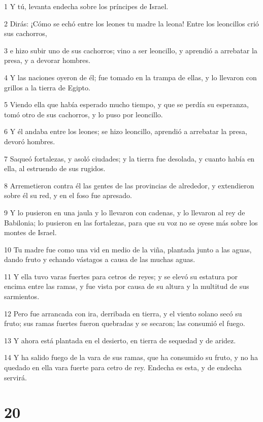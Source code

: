 \par 1 Y tú, levanta endecha sobre los príncipes de Israel.
\par 2 Dirás: ¡Cómo se echó entre los leones tu madre la leona! Entre los leoncillos crió sus cachorros,
\par 3 e hizo subir uno de sus cachorros; vino a ser leoncillo, y aprendió a arrebatar la presa, y a devorar hombres.
\par 4 Y las naciones oyeron de él; fue tomado en la trampa de ellas, y lo llevaron con grillos a la tierra de Egipto.
\par 5 Viendo ella que había esperado mucho tiempo, y que se perdía su esperanza, tomó otro de sus cachorros, y lo puso por leoncillo.
\par 6 Y él andaba entre los leones; se hizo leoncillo, aprendió a arrebatar la presa, devoró hombres.
\par 7 Saqueó fortalezas, y asoló ciudades; y la tierra fue desolada, y cuanto había en ella, al estruendo de sus rugidos.
\par 8 Arremetieron contra él las gentes de las provincias de alrededor, y extendieron sobre él su red, y en el foso fue apresado.
\par 9 Y lo pusieron en una jaula y lo llevaron con cadenas, y lo llevaron al rey de Babilonia; lo pusieron en las fortalezas, para que su voz no se oyese más sobre los montes de Israel.
\par 10 Tu madre fue como una vid en medio de la viña, plantada junto a las aguas, dando fruto y echando vástagos a causa de las muchas aguas.
\par 11 Y ella tuvo varas fuertes para cetros de reyes; y se elevó su estatura por encima entre las ramas, y fue vista por causa de su altura y la multitud de sus sarmientos.
\par 12 Pero fue arrancada con ira, derribada en tierra, y el viento solano secó su fruto; sus ramas fuertes fueron quebradas y se secaron; las consumió el fuego.
\par 13 Y ahora está plantada en el desierto, en tierra de sequedad y de aridez.
\par 14 Y ha salido fuego de la vara de sus ramas, que ha consumido su fruto, y no ha quedado en ella vara fuerte para cetro de rey. Endecha es esta, y de endecha servirá.

\chapter{20}

